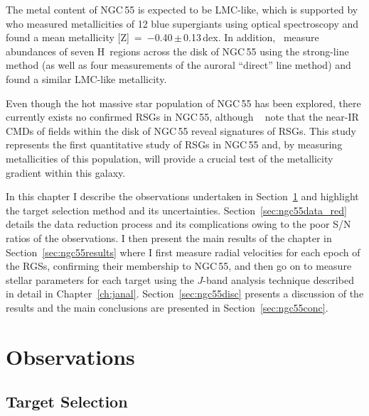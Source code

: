 The metal content of NGC\,55 is expected to be LMC-like, which is supported by~\cite{2012A&A...542A..79C} who measured metallicities of 12 blue supergiants using optical spectroscopy and found a mean metallicity [Z]~=~$-$0.40\,$\pm$\,0.13\,dex.
In addition,~\cite{1983MNRAS.204..743W} measure abundances of seven H\,\2 regions across the disk of NGC\,55 using the strong-line method (as well as four measurements of the auroral ``direct'' line method) and found a similar LMC-like metallicity.

Even though the hot massive star population of NGC\,55 has been explored,
there currently exists no confirmed RSGs in NGC\,55, although ~\cite{2005ApJ...622..279D} note that the near-IR CMDs of fields within the disk of NGC\,55 reveal signatures of RSGs.
This study represents the first quantitative study of RSGs in NGC\,55 and, by measuring metallicities of this population, will provide a crucial test of the metallicity gradient within this galaxy.

In this chapter I describe the observations undertaken in Section~\ref{sec:ngc55obs} and highlight the target selection method and its uncertainties.
Section~\ref{sec:ngc55data_red} details the data reduction process and its complications owing to the poor S/N ratios of the observations.
I then present the main results of the chapter in Section~\ref{sec:ngc55results} where I first measure radial velocities for each epoch of the RGSs, confirming their membership to NGC\,55, and then go on to measure stellar parameters for each target using the $J$-band analysis technique described in detail in Chapter~\ref{ch:janal}.
Section~\ref{sec:ngc55disc} presents a discussion of the results and the main conclusions are presented in Section~\ref{sec:ngc55conc}.


\section{Observations} %
\label{sec:ngc55obs}

\subsection{Target Selection} %
\label{sub:target_selection}


